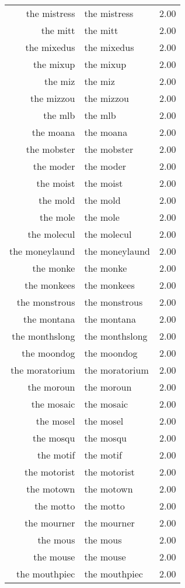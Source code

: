 \begin{table}[ht]
\begin{tabular}{rlr}
  the mistress & the mistress & 2.00 \\ 
  the mitt & the mitt & 2.00 \\ 
  the mixedus & the mixedus & 2.00 \\ 
  the mixup & the mixup & 2.00 \\ 
  the miz & the miz & 2.00 \\ 
  the mizzou & the mizzou & 2.00 \\ 
  the mlb & the mlb & 2.00 \\ 
  the moana & the moana & 2.00 \\ 
  the mobster & the mobster & 2.00 \\ 
  the moder & the moder & 2.00 \\ 
  the moist & the moist & 2.00 \\ 
  the mold & the mold & 2.00 \\ 
  the mole & the mole & 2.00 \\ 
  the molecul & the molecul & 2.00 \\ 
  the moneylaund & the moneylaund & 2.00 \\ 
  the monke & the monke & 2.00 \\ 
  the monkees & the monkees & 2.00 \\ 
  the monstrous & the monstrous & 2.00 \\ 
  the montana & the montana & 2.00 \\ 
  the monthslong & the monthslong & 2.00 \\ 
  the moondog & the moondog & 2.00 \\ 
  the moratorium & the moratorium & 2.00 \\ 
  the moroun & the moroun & 2.00 \\ 
  the mosaic & the mosaic & 2.00 \\ 
  the mosel & the mosel & 2.00 \\ 
  the mosqu & the mosqu & 2.00 \\ 
  the motif & the motif & 2.00 \\ 
  the motorist & the motorist & 2.00 \\ 
  the motown & the motown & 2.00 \\ 
  the motto & the motto & 2.00 \\ 
  the mourner & the mourner & 2.00 \\ 
  the mous & the mous & 2.00 \\ 
  the mouse & the mouse & 2.00 \\ 
  the mouthpiec & the mouthpiec & 2.00 \\ 

\end{tabular}
\end{table}
